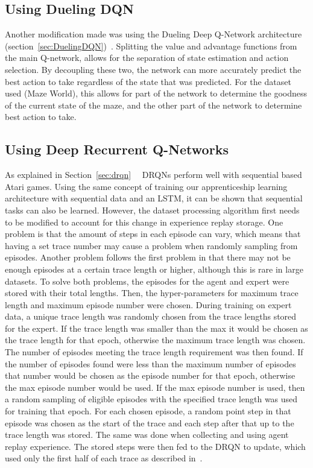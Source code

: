 \documentclass[12pt,american]{report}
\begin{document}
\subsection{Using Dueling DQN}
Another modification made was using the Dueling Deep Q-Network architecture (section~\ref{sec:DuelingDQN})~\cite{wang2015dueling}.  Splitting the value and advantage functions from the main Q-network, allows for the separation of state estimation and action selection.  By decoupling these two, the network can more accurately predict the best action to take regardless of the state that was predicted. For the dataset used (Maze World), this allows for part of the network to determine the goodness of the current state of the maze, and the other part of the network to determine best action to take. 

\subsection{Using Deep Recurrent Q-Networks}
\label{sec:drqn-implementation}
As explained in Section~\ref{sec:drqn}~\cite{HausknechtDRQN}~\cite{DBLP:journals/corr/LampleC16} DRQNs perform well with sequential based Atari games. Using the same concept of training our apprenticeship learning architecture with sequential data and an LSTM, it can be shown that sequential tasks can also be learned.  However, the dataset processing algorithm first needs to be modified to account for this change in experience replay storage.  One problem is that the amount of steps in each episode can vary, which means that having a set trace number may cause a problem when randomly sampling from episodes.  Another problem follows the first problem in that there may not be enough episodes at a certain trace length or higher, although this is rare in large datasets.  To solve both problems, the episodes for the agent and expert were stored with their total lengths.  Then, the hyper-parameters for maximum trace length and maximum episode number were chosen.  During training on expert data, a unique trace length was randomly chosen from the trace lengths stored for the expert.  If the trace length was smaller than the max it would be chosen as the trace length for that epoch, otherwise the maximum trace length was chosen.  The number of episodes meeting the trace length requirement was then found.  If the number of episodes found were less than the maximum number of episodes that number would be chosen as the episode number for that epoch, otherwise the max episode number would be used.  If the max episode number is used, then a random sampling of eligible episodes with the specified trace length was used for training that epoch.  For each chosen episode, a random point step in that episode was chosen as the start of the trace and each step after that up to the trace length was stored.  The same was done when collecting and using agent replay experience. The stored steps were then fed to the DRQN to update, which used only the first half of each trace as described in~\cite{DBLP:journals/corr/LampleC16}.  
\end{document}
